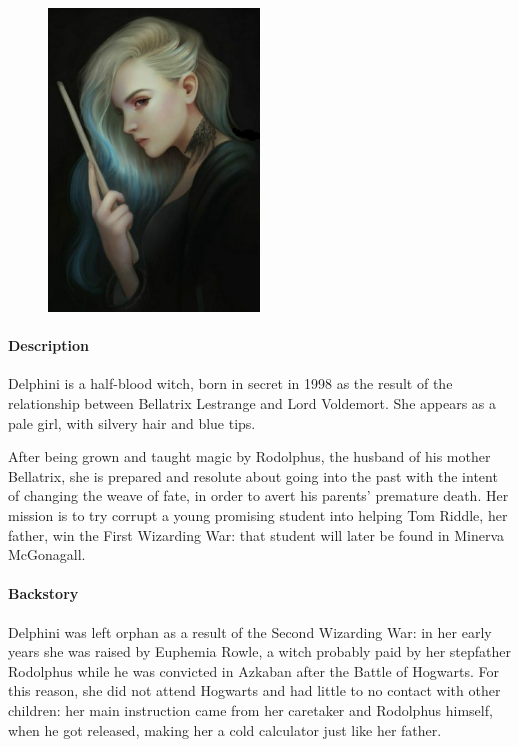 \begin{figure}
\centering
\includegraphics[max width=0.5\textwidth]{../Pictures/Characters/Portraits/Delphini_portrait.png}
\end{figure}

\paragraph{Description}
Delphini is a half-blood witch, born in secret in 1998 as the result of the relationship between Bellatrix Lestrange and Lord Voldemort. She appears as a pale girl, with silvery hair and blue tips.

After being grown and taught magic by Rodolphus, the husband of his mother Bellatrix, she is prepared and resolute about going into the past with the intent of changing the weave of fate, in order to avert his parents' premature death. Her mission is to try corrupt a young promising student into helping Tom Riddle, her father, win the First Wizarding War: that student will later be found in Minerva McGonagall. 

\paragraph{Backstory}
Delphini was left orphan as a result of the Second Wizarding War: in her early years she was raised by Euphemia Rowle, a witch probably paid by her stepfather Rodolphus while he was convicted in Azkaban after the Battle of Hogwarts. For this reason, she did not attend Hogwarts and had little to no contact with other children: her main instruction came from her caretaker and Rodolphus himself, when he got released, making her a cold calculator just like her father.

